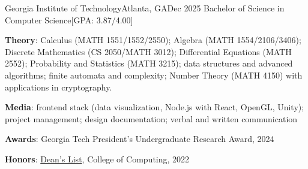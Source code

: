 \begin{resume-itemize}
  {Georgia Institute of Technology}{Atlanta, GA}{Dec 2025}
  {Bachelor of Science in Computer Science}[GPA: 3.87/4.00]
    \item \textbf{Theory}: Calculus (MATH 1551/1552/2550); 
    Algebra (MATH 1554/2106/3406); 
    Discrete Mathematics (CS 2050/MATH 3012); 
    Differential Equations (MATH 2552);
    Probability and Statistics (MATH 3215); 
    data structures and advanced algorithms;
    finite automata and complexity;
    Number Theory (MATH 4150) with applications in cryptography.
    \item \textbf{Media}:    
    frontend stack (data visualization, Node.js with React, OpenGL, Unity); 
    project management; design documentation; verbal and written communication
    \item \textbf{Awards}: Georgia Tech President's Undergraduate Research Award, 2024
    \item \textbf{Honors}: \href{https://gatech.meritpages.com/stories/Jaehoon-Song-Named-to-Dean-s-List-at-Georgia-Tech-for-the-Summer-2022-Semester/104219189}{Dean's List}, College of Computing, 2022
\end{resume-itemize}

